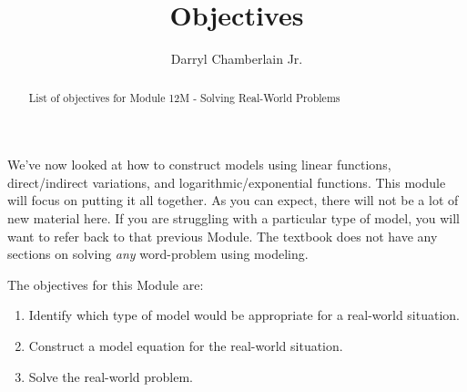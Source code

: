 \documentclass{ximera}
\author{Darryl Chamberlain Jr.}
\title{Objectives}
\begin{document}
\begin{abstract}
List of objectives for Module 12M - Solving Real-World Problems
\end{abstract}
\maketitle

We've now looked at how to construct models using linear functions, direct/indirect variations, and logarithmic/exponential functions. This module will focus on putting it all together. As you can expect, there will not be a lot of new material here. If you are struggling with a particular type of model, you will want to refer back to that previous Module. The textbook does not have any sections on solving \textit{any} word-problem using modeling. 

The objectives for this Module are: 
\begin{enumerate}
    \item Identify which type of model would be appropriate for a real-world situation.
	\item Construct a model equation for the real-world situation. 
	\item Solve the real-world problem. 
\end{enumerate}
\end{document}
